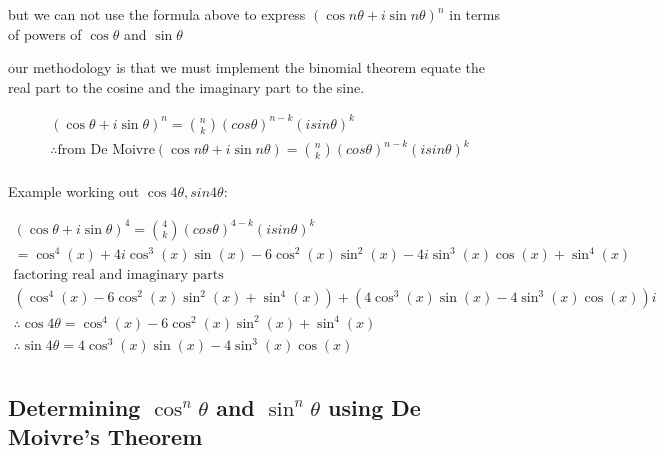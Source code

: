 but we can not use the formula above to express $(\cos{n\theta}+i\sin{n\theta})^n$ in terms of powers of $\cos{\theta}$ and $\sin{\theta}$

our methodology is that we must implement the binomial theorem equate the real part to the cosine and the imaginary part to the sine.   

    \begin{equation}
        \begin{split}
            (\cos{\theta}+i\sin{\theta})^n = \binom{n}{k}(cos{\theta})^{n-k}(isin{\theta})^{k} \\  
            \therefore \text{from De Moivre}  (\cos{n\theta}+i\sin{n\theta}) = \binom{n}{k}(cos{\theta})^{n-k}(isin{\theta})^{k} \\
        \end{split}
    \end{equation}

Example working out $\cos{4\theta},sin{4\theta}$:

    \begin{equation}
        \begin{split}
            (\cos{\theta}+i\sin{\theta})^4 = \binom{4}{k}(cos{\theta})^{4-k}(isin{\theta})^{k} \\            
            = \cos ^4\left(x\right)+4i\cos ^3\left(x\right)\sin \left(x\right)-6\cos ^2\left(x\right)\sin ^2\left(x\right)-4i\sin ^3\left(x\right)\cos \left(x\right)+\sin ^4\left(x\right) \\
            \text{factoring real and imaginary parts} \\
            \left(\cos ^4\left(x\right)-6\cos ^2\left(x\right)\sin ^2\left(x\right)+\sin ^4\left(x\right)\right)+\left(4\cos ^3\left(x\right)\sin \left(x\right)-4\sin ^3\left(x\right)\cos \left(x\right)\right)i \\            
            \therefore \cos{4\theta} = \cos ^4\left(x\right)-6\cos ^2\left(x\right)\sin ^2\left(x\right)+\sin ^4\left(x\right) \\
            \therefore \sin{4\theta} = 4\cos ^3\left(x\right)\sin \left(x\right)-4\sin ^3\left(x\right)\cos \left(x\right) \\
        \end{split}
    \end{equation}

\subsection{Determining $\cos^n{\theta}$ and $\sin^n{\theta}$ using De Moivre's Theorem}

